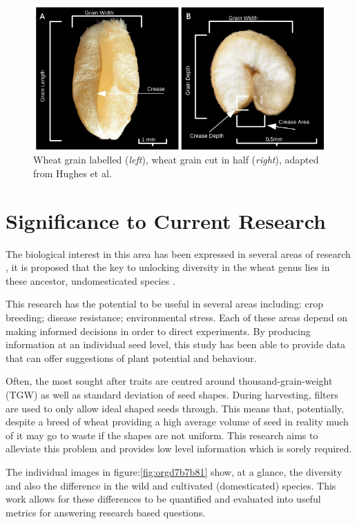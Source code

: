 \documentclass[11pt]{report}
\begin{document}
\begin{figure}[htbp]
\centering
\includegraphics[width=17cm]{./images/seeds.png}
\caption{\label{fig:orgc51b8e3}
Wheat grain labelled (\emph{left}), wheat grain cut in half (\emph{right}), adapted from Hughes et al. \cite{Hughes2017}}
\end{figure}

\section{Significance to Current Research}
\label{sec:org91bb026}
The biological interest in this area has been expressed in several areas of research \cite{Leigh2013}, it is proposed that the key to unlocking diversity in the wheat genus lies in these ancestor, undomesticated species \cite{Cockram2007}.

This research has the potential to be useful in several areas including: crop breeding; disease resistance; environmental stress. Each of these areas depend on making informed decisions in order to direct experiments. By producing information at an individual seed level, this study has been able to provide data that can offer suggestions of plant potential and behaviour.

Often, the most sought after traits are centred around thousand-grain-weight (TGW) as well as standard deviation of seed shapes. During harvesting, filters are used to only allow ideal shaped seeds through. This means that, potentially, despite a breed of wheat providing a high average volume of seed in reality much of it may go to waste if the shapes are not uniform. This research aims to alleviate this problem and provides low level information which is sorely required.

The individual images in figure:\ref{fig:orgd7b7b81} show, at a glance, the diversity and also the difference in the wild and cultivated (domesticated)
species. This work allows for these differences to be quantified and evaluated into useful metrics for answering research based questions.
\end{document}
